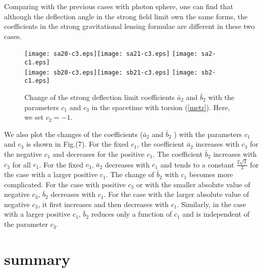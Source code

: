 \documentclass[aps,showpacs,preprintnumbers,amsmath,amssymb]{revtex4}
\begin{document}
Comparing with the previous cases with photon sphere, one can find that although the deflection angle in the strong field limit own the same forms, the coefficients in the strong gravitational lensing formulae are different in these two cases.
\begin{figure}[ht]\label{pas20}
\begin{center}
\texttt{[image: sa20-c3.eps]}\texttt{[image: sa21-c3.eps]}
\texttt{[image: sa2-c1.eps]}\\
\texttt{[image: sb20-c3.eps]}\texttt{[image: sb21-c3.eps]}
\texttt{[image: sb2-c1.eps]}
\caption{Change of the strong deflection limit coefficients $\bar{a}_2$ and $\bar{b}_2$ with the parameters $c_1$ and $c_3$ in the spacetime with torsion (\ref{metr}). Here, we set $c_2=-1$.}
\end{center}
\end{figure}
We also plot the changes of the coefficients ($\bar{a}_2$ and $\bar{b}_2$ ) with the parameters $c_1$ and $c_3$ is shown in Fig.(7). For the fixed $c_1$, the coefficient $\bar{a}_2$ increases with $c_3$ for the negative $c_1$ and decreases for the positive $c_1$.
The coefficient $\bar{b}_2$ increases with $c_3$ for all $c_1$.  For the fixed $c_3$,
$\bar{a}_2$ decreases with $c_1$ and tends to a constant $\frac{2\sqrt{3}}{3}$ for the case with a larger positive $c_1$. The change of $\bar{b}_2$ with $c_1$ becomes more complicated.
For the case with positive $c_3$ or with the smaller absolute value of negative $c_3$,
$\bar{b}_2$ decreases with $c_1$.  For the case with the larger absolute value of negative $c_3$, it first increases and then decreases with $c_1$. Similarly, in the case with a larger positive $c_1$, $\bar{b}_2$ reduces only a function of $c_1$ and is independent of the parameter $c_3$.

\section{summary}
\end{document}
